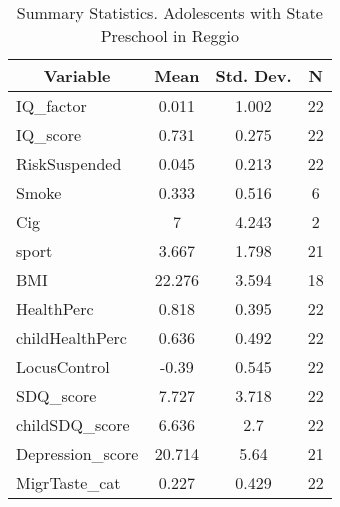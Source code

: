 
\begin{table}[htbp]\centering \caption{Summary Statistics. Adolescents with State Preschool in Reggio \label{bothAdolmaternaStatReggio}}
\begin{tabular}{l c c  c}\hline\hline
\multicolumn{1}{c}{\textbf{Variable}} & \textbf{Mean}
 & \textbf{Std. Dev.} & \textbf{N}\\ \hline
IQ\_factor & 0.011 & 1.002  & 22\\
IQ\_score & 0.731 & 0.275  & 22\\
RiskSuspended & 0.045 & 0.213  & 22\\
Smoke & 0.333 & 0.516  & 6\\
Cig & 7 & 4.243  & 2\\
sport & 3.667 & 1.798  & 21\\
BMI & 22.276 & 3.594  & 18\\
HealthPerc & 0.818 & 0.395  & 22\\
childHealthPerc & 0.636 & 0.492  & 22\\
LocusControl & -0.39 & 0.545  & 22\\
SDQ\_score & 7.727 & 3.718  & 22\\
childSDQ\_score & 6.636 & 2.7  & 22\\
Depression\_score & 20.714 & 5.64  & 21\\
MigrTaste\_cat & 0.227 & 0.429  & 22\\
\hline\end{tabular}
\end{table}

